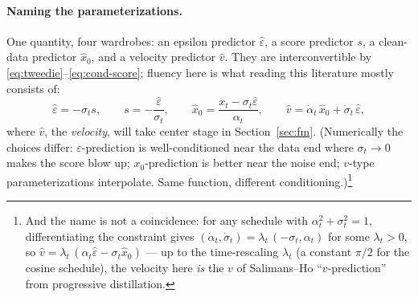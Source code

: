 \documentclass[10pt,a4paper]{article}
\newcommand{\score}{s}
\newcommand{\veps}{\varepsilon}
\begin{document}
\paragraph{Naming the parameterizations.}
One quantity, four wardrobes: an epsilon predictor $\hat\veps$, a score
predictor $\score$, a clean-data predictor $\hat{x}_0$, and a velocity
predictor $\hat v$. They are interconvertible by
\eqref{eq:tweedie}--\eqref{eq:cond-score}; fluency here is what reading
this literature mostly consists of:
\begin{equation}
\hat\veps = -\sigma_t \score, \qquad
\score = -\frac{\hat\veps}{\sigma_t}, \qquad
\hat{x}_0 = \frac{x_t - \sigma_t \hat\veps}{\alpha_t}, \qquad
\hat{v} = \dot\alpha_t\, \hat{x}_0 + \dot\sigma_t\, \hat\veps,
\label{eq:wardrobes}
\end{equation}
where $\hat{v}$, the \emph{velocity}, will take center stage in
Section~\ref{sec:fm}. (Numerically the choices differ: $\veps$-prediction
is well-conditioned near the data end where $\sigma_t \to 0$ makes the
score blow up; $x_0$-prediction is better near the noise end; $v$-type
parameterizations interpolate. Same function, different
conditioning.)\footnote{And the name is not a coincidence: for any schedule
with $\alpha_t^2 + \sigma_t^2 = 1$, differentiating the constraint gives
$(\dot\alpha_t, \dot\sigma_t) = \lambda_t\,(-\sigma_t, \alpha_t)$ for some
$\lambda_t > 0$, so $\hat{v} = \lambda_t\,(\alpha_t \hat\veps - \sigma_t
\hat{x}_0)$ --- up to the time-rescaling $\lambda_t$ (a constant $\pi/2$
for the cosine schedule), the velocity here \emph{is} the $v$ of
Salimans--Ho ``$v$-prediction'' from progressive distillation.}
\end{document}
